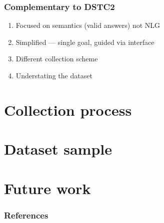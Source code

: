 \documentclass[10pt, compress,british,xcolor={svgnames,dvipsnames,x11names},trans]{beamer}
\begin{document}
\begin{frame}\frametitle{Complementary to DSTC2\cite{henderson2014dstc2}}
    \begin{enumerate}
        \item Focused on semantics (valid answers) not NLG
        \item Simplified --- single goal, guided via interface  
        \item Different collection scheme 
        \item <4> Understating the dataset
    \end{enumerate}
\end{frame}


\section{Collection process}

\section{Dataset sample}

\section{Future work}


\appendix

\begin{frame}[allowframebreaks]
        \frametitle{References}
        
        
\end{frame}
\end{document}
